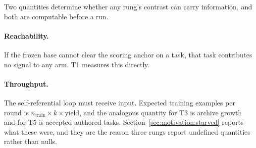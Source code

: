 Two quantities determine whether any rung's contrast can carry information, and both are
computable before a run.

\paragraph{Reachability.} If the frozen base cannot clear the scoring anchor on a task, that task
contributes no signal to any arm. T1 measures this directly.

\paragraph{Throughput.} The self-referential loop must receive input. Expected training examples
per round is $n_{\mathrm{train}} \times k \times \text{yield}$, and the analogous quantity for T3
is archive growth and for T5 is accepted authored tasks. Section~\ref{sec:motivation:starved}
reports what these were, and they are the reason three rungs report undefined quantities rather
than nulls.
